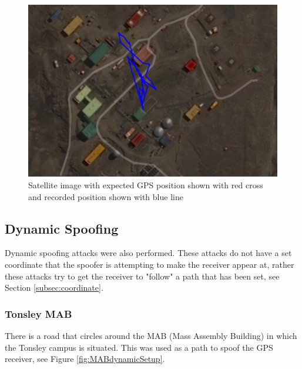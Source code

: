 \begin{figure}[H]
    \begin{centering}
        \includegraphics[width=14cm,keepaspectratio]{Figures/2021_3_30_static_antarctica_Satellite.PNG}
        \caption{Satellite image with expected GPS position shown with red cross and recorded position shown with blue line}
        \label{fig:antarcticaSatelliteImage}
    \end{centering}
\end{figure}

\subsection{Dynamic Spoofing}
Dynamic spoofing attacks were also performed. These attacks do not have a set coordinate that the spoofer is attempting to make the receiver appear at, rather these
attacks try to get the receiver to "follow" a path that has been set, see Section \ref{subsec:coordinate}.
\subsubsection{Tonsley MAB}
There is a road that circles around the MAB (Mass Assembly Building) in which the \univname Tonsley campus is situated. This was used as a path to spoof the GPS receiver,
see Figure \ref{fig:MABdynamicSetup}.

